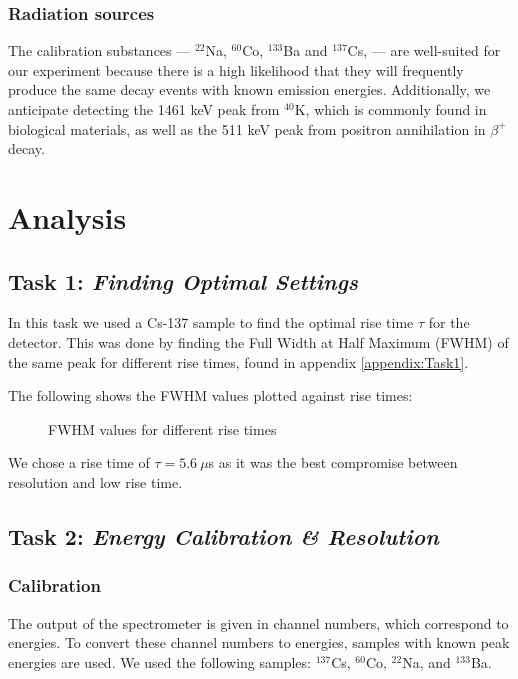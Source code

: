 \documentclass{article}
\begin{document}
\subsubsection{Radiation sources}
The calibration substances —  $^{22}$Na, $^{60}$Co, $^{133}$Ba and $^{137}$Cs, — are well-suited for our experiment because there is a high likelihood that they will frequently produce the same decay events with known emission energies. Additionally, we anticipate detecting the 1461 keV peak from $^{40}$K, which is commonly found in biological materials, as well as the 511 keV peak from positron annihilation in $\beta^+$ decay.

\pagebreak{}

\section{Analysis}

\subsection{Task 1: \textit{Finding Optimal Settings}}

In this task we used a Cs-137 sample to find the optimal rise time $\tau$ for the detector. This was done by finding the Full Width at Half Maximum (FWHM) of the same peak for different rise times, found in appendix \ref{appendix:Task1}. 

The following shows the FWHM values plotted against rise times:

\begin{figure}[h!]
	\centering
	\scalebox{1}{}
	\caption{FWHM values for different rise times}
	\label{fig:risetimes}
\end{figure}

We chose a rise time of $\tau = 5.6 \ \mu$s as it was the best compromise between resolution and low rise time. 

\pagebreak{}

\subsection{Task 2: \textit{Energy Calibration \& Resolution}}
\subsubsection{Calibration}

The output of the spectrometer is given in channel numbers, which correspond to energies. To convert these channel numbers to energies, samples with known peak energies are used.
We used the following samples: $^{137}$Cs, $^{60}$Co, $^{22}$Na, and $^{133}$Ba.
\end{document}
